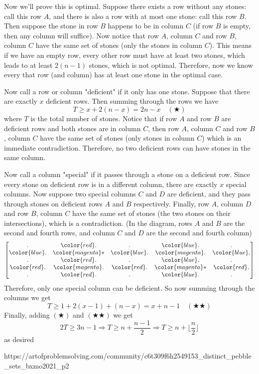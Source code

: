 \documentclass[a4paper]{article}
\begin{document}
\begin{question*}{}
{        Now we'll prove this is optimal. Suppose there exists a row without any stones: call this row $A$, and there is also a row with at most one stone: call this row $B$. Then suppose the stone in row $B$ happens to be in column $C$ (if row $B$ is empty, then any column will suffice). Now notice that row $A$, column $C$ and row $B$, column $C$ have the same set of stones (only the stones in column $C$). This means if we have an empty row, every other row must have at least two stones, which leads to at least $2(n-1)$ stones, which is not optimal. Therefore, now we know every that row (and column) has at least one stone in the optimal case.

        Now call a row or column "deficient" if it only has one stone. Suppose that there are exactly $x$ deficient rows. Then summing through the rows we have $$T \geq x + 2(n-x) = 2n - x \quad (\bigstar)$$where $T$ is the total number of stones. Notice that if row $A$ and row $B$ are deficient rows and both stones are in column $C$, then row $A$, column $C$ and row $B$, column $C$ have the same set of stones (only stones in column $C$) which is an immediate contradiction. Therefore, no two deficient rows can have stones in the same column.

        Now call a column "special" if it passes through a stone on a deficient row. Since every stone on deficient row is in a different column, there are exactly $x$ special columns. Now suppose two special columns $C$ and $D$ are deficient, and they pass through stones on deficient rows $A$ and $B$ respectively. Finally, row $A$, column $D$ and row $B$, column $C$ have the same set of stones (the two stones on their intersections), which is a contradiction. (In the diagram, rows $A$ and $B$ are the second and fourth rows, and column $C$ and $D$ are the second and fourth column) $$\begin{bmatrix} . & \color {red} . & . & \color {blue} . & . \\ \color {blue} . & \color {magenta} \ast & \color {blue} . & \color{magenta} . & \color {blue} . \\ . & \color {red} . & . & \color {blue} . & . \\ \color {red} . & \color{magenta} . & \color {red} . & \color {magenta} \ast & \color {red} . \\ . & \color {red} . & . & \color {blue} . & . \end{bmatrix}$$
        Therefore, only one special column can be deficient. So now summing through the columns we get $$T \geq 1 + 2(x-1) + (n-x) = x + n - 1 \quad (\bigstar\bigstar)$$Finally, adding $(\bigstar)$ and $(\bigstar\bigstar)$ we get $$2T \geq 3n - 1 \Longrightarrow T \geq n + \frac{n-1}{2} \Longrightarrow \boxed {T \geq n + \bigg\lfloor \frac{n}{2} \bigg\rfloor}$$as desired 
        }{%
        https://artofproblemsolving.com/community/c6t309f6h2549153_distinct_pebble_sets_bxmo2021_p2
    }
\end{question*}
\end{document}
